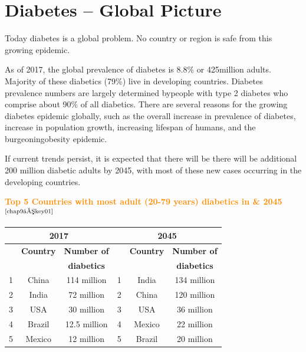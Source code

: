 \chapter{Diabetes – Global Picture}\label{chap9}

Today diabetes is a global problem. No country or region is safe from this growing epidemic.

As of 2017, the global prevalence of diabetes is 8.8\% or 425\break million adults. Majority of these diabetics (79\%) live in developing countries. Diabetes prevalence numbers are largely determined by\break people with type 2 diabetes who comprise about 90\% of all diabetics. There are several reasons for the growing diabetes epidemic globally, such as the overall increase in prevalence of diabetes, increase in population growth, increasing lifespan of humans, and the burgeoning\break obesity epidemic.

If current trends persist, it is expected that there will be there will be additional 200 million diabetic adults by 2045, with most of these new cases occurring in the developing countries.

\textcolor{darkorange}{\textbf{Top 5 Countries with most adult (20-79 years) diabetics in \& 2045}$^{\text{\cite{chap9–key01}}}$}

{
\begin{table}
\centering
\begin{tabular}{|c|c|c|c|c|c|}
\hline
\multicolumn{3}{|c|}{{\cellcolor{lightblue}\large\textbf{2017}}} & \multicolumn{3}{c|}{{\cellcolor{yellow}\large\textbf{2045}}}\\
\hline
 & \textbf{Country} & \textbf{Number of} &  & \textbf{Country} & \textbf{Number of}\\
 &  & \textbf{diabetics} &  &  & \textbf{diabetics}\\
 \hline
1 & China & 114 million & 1 & India & 134 million\\
 \hline
2 & India & 72 million & 2 & China & 120 million\\
 \hline
3 & USA & 30 million & 3 & USA & 36 million\\
 \hline
4 & Brazil & 12.5 million & 4 & Mexico & 22 million\\
 \hline
5 & Mexico & 12 million & 5 & Brazil & 20 million\\
 \hline
\end{tabular}
\end{table}
}\relax

\clearpage

